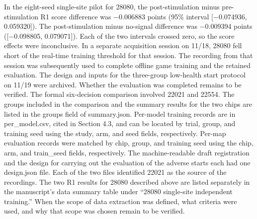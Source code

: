 \documentclass{article}
\begin{document}
In the eight-seed single-site pilot for 28080, the post-stimulation minus pre-stimulation R1 score difference was \ensuremath{-}0.006883 points (95\% interval [\ensuremath{-}0.074936, 0.059320]). The post-stimulation minus no-signal difference was \ensuremath{-}0.009394 points ([\ensuremath{-}0.098805, 0.079071]). Each of the two intervals crossed zero, so the score effects were inconclusive. In a separate acquisition session on 11/18, 28080 fell short of the real-time training threshold for that session. The recording from that session was subsequently used to complete offline game training and the retained evaluation. The design and inputs for the three-group low-health start protocol on 11/19 were archived. Whether the evaluation was completed remains to be verified. The formal six-decision comparison involved 22021 and 22554. The groups included in the comparison and the summary results for the two chips are listed in the groups field of summary.json. Per-model training records are in per\_\allowbreak{}model.csv, cited in Section 4.3, and can be located by trial, group, and training seed using the study, arm, and seed fields, respectively. Per-map evaluation records were matched by chip, group, and training seed using the chip, arm, and train\_\allowbreak{}seed fields, respectively. The machine-readable draft registration and the design for carrying out the evaluation of the adverse starts each had one design.json file. Each of the two files identified 22021 as the source of the recordings. The two R1 results for 28080 described above are listed separately in the manuscript's data summary table under “28080 single-site independent training.” When the scope of data extraction was defined, what criteria were used, and why that scope was chosen remain to be verified.
\end{document}
